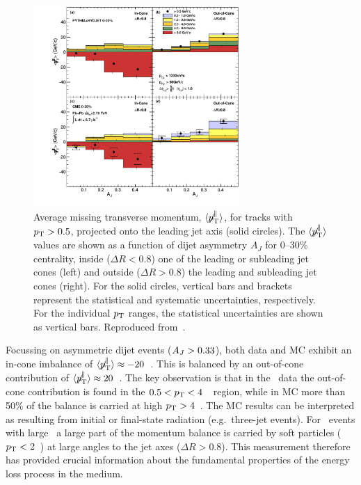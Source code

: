 \begin{figure}[!ht]
\begin{center}
\includegraphics[width=0.7\textwidth]{jetfigures/missingPtParallel-Corrected-data-InConeOutConeDPhiCut_ntv6_2.pdf}
\caption{Average missing transverse momentum,
$\langle \displaystyle{\not} p_{\mathrm{T}}^{\parallel} \rangle$,
for tracks with $\mbox{$p_{\mathrm{T}}$} > 0.5$\GeVc, projected onto the leading jet axis (solid circles).
The $\langle \displaystyle{\not} p_{\mathrm{T}}^{\parallel} \rangle$ values are
shown as a function of dijet asymmetry
$A_J$ for 0--30\% centrality, inside ($\Delta R < 0.8$) one of the leading or subleading jet cones (left) and
outside ($\Delta R > 0.8$) the leading and subleading jet cones (right).
For the solid circles, vertical bars and brackets represent
the statistical and systematic uncertainties, respectively.
For the individual $\mbox{$p_{\mathrm{T}}$}$ ranges, the statistical uncertainties are shown as vertical bars.
Reproduced from~\cite{Chatrchyan:2011sx}.}
\label{fig:GR:CMS_missingpT}
\end{center}
\end{figure}

Focussing on asymmetric dijet events ($A_J > 0.33$), both data and MC exhibit an
 in-cone imbalance of $\langle \displaystyle{\not} p_{\mathrm{T}}^{\parallel} \rangle \approx
-20$~\GeVc. This is balanced by an out-of-cone contribution of
$\langle \displaystyle{\not} p_{\mathrm{T}}^{\parallel} \rangle \approx 20$~\GeVc. The key
observation is that in the \PbPb\ data the out-of-cone contribution is found in the $0.5 < \mbox{$p_{\mathrm{T}}$} < 4$~\GeVc\ region,
while in MC more than 50\% of the balance is carried at high $\mbox{$p_{\mathrm{T}}$} > 4$~\GeVc. The MC
results can be interpreted as resulting from initial or final-state radiation (e.g.\ three-jet events).
For \PbPb\ events with large \AJ\ a large part of the momentum balance is
carried by soft particles ($\mbox{$p_{\mathrm{T}}$} < 2$~\GeVc) at large angles to the jet axes ($\Delta R > 0.8$). This measurement
therefore has provided crucial information about the fundamental properties of the energy loss process
in the medium.

